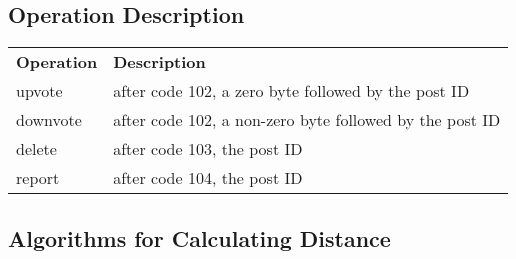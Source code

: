 \documentclass[12pt, a4paper]{article}
\begin{document}
\subsection{Operation Description}
\begin{table}[h]
\centering
\label{my-label}
\begin{tabular}{ll}
\textbf{Operation} &\textbf{Description}\\
upvote & after code 102, a zero byte followed by the post ID\\
downvote & after code 102, a non-zero byte followed by the post ID\\
delete & after code 103, the post ID\\
report & after code 104, the post ID\\
\end{tabular}
\end{table}

\clearpage
\subsection{Algorithms for Calculating Distance}
\end{document}
